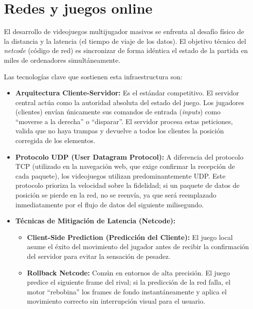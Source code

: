 \documentclass[12pt]{report}
\begin{document}
\section{Redes y juegos online}

El desarrollo de videojuegos multijugador masivos se enfrenta al desafío físico de la distancia y la latencia (el tiempo de viaje de los datos). El objetivo técnico del \textit{netcode} (código de red) es sincronizar de forma idéntica el estado de la partida en miles de ordenadores simultáneamente.

Las tecnologías clave que sostienen esta infraestructura son:

\begin{itemize}
    \item \textbf{Arquitectura Cliente-Servidor:} Es el estándar competitivo. El servidor central actúa como la autoridad absoluta del estado del juego. Los jugadores (clientes) envían únicamente sus comandos de entrada (\textit{inputs}) como ``moverse a la derecha'' o ``disparar''. El servidor procesa estas peticiones, valida que no haya trampas y devuelve a todos los clientes la posición corregida de los elementos.
    \item \textbf{Protocolo UDP (User Datagram Protocol):} A diferencia del protocolo TCP (utilizado en la navegación web, que exige confirmar la recepción de cada paquete), los videojuegos utilizan predominantemente UDP. Este protocolo prioriza la velocidad sobre la fidelidad; si un paquete de datos de posición se pierde en la red, no se reenvía, ya que será reemplazado inmediatamente por el flujo de datos del siguiente milisegundo.
    \item \textbf{Técnicas de Mitigación de Latencia (Netcode):}
    \begin{itemize}
        \item \textbf{Client-Side Prediction (Predicción del Cliente):} El juego local asume el éxito del movimiento del jugador antes de recibir la confirmación del servidor para evitar la sensación de pesadez.
        \item \textbf{Rollback Netcode:} Común en entornos de alta precisión. El juego predice el siguiente frame del rival; si la predicción de la red falla, el motor ``rebobina'' los frames de fondo instantáneamente y aplica el movimiento correcto sin interrupción visual para el usuario.
    \end{itemize}
\end{itemize}
\end{document}
